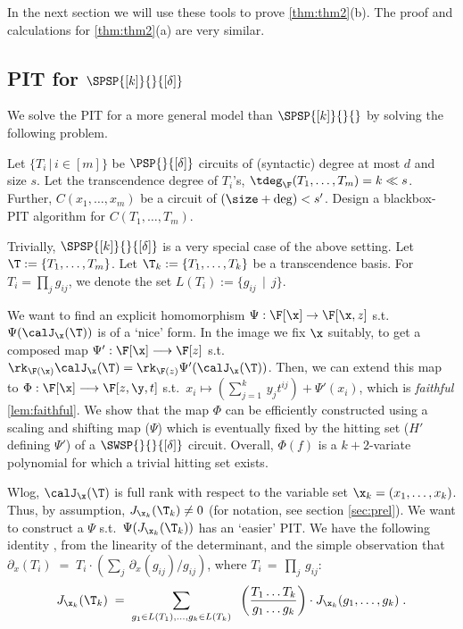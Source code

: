 In the next section we will use these tools to prove \autoref{thm:thm2}(b). The proof and calculations for \autoref{thm:thm2}(a) are very similar.

\subsection{PIT for \texorpdfstring{$\SPSP{[k]}{}{[\delta]}$}{SkPSPdelta}} \label{sec:SkPSPdelta}

We solve the PIT for a more general model than $\SPSP{[k]}{}{}$ by solving the following problem.

\begin{problem}\label{prob:prob1-thm2}
 Let $\{T_i \,|\, i \in [m]\}$ be $\PSP{}{[\delta]}$ circuits of (syntactic) degree at most $d$ and size $s$. Let the transcendence degree of $T_i$'s, $\tdeg_{\F}(T_1,\hdots,T_m)= k\ll s$. Further, $C(x_1,\hdots,x_m)$ be a circuit of $(\size + \deg) < s'$. Design a blackbox-PIT algorithm for $C(T_1,\hdots,T_m)$.
\end{problem}

Trivially, $\SPSP{[k]}{}{[\delta]}$ is a very special case of the above setting. Let $\T:=\{T_1,\hdots,T_m\}$. Let $\T_{k}:=\{T_1,\hdots,T_k\}$ be a transcendence basis. For $T_i=\prod_{j} g_{ij}$, we denote the set $L(T_i):=\{g_{ij}\,\mid\,j\}$. 

We want to find an explicit homomorphism $\Psi : \F[\x] \to \F[\x,z]$ s.t.~$\Psi(\calJ_{\x}(\T))$ is of a `nice' form. In the image we fix $\x$ suitably, to get a composed map $\Psi' : \F[\x] \longrightarrow \F[z]$ s.t.~$\rk_{\F(\x)}\calJ_{\x}(\T) = \rk_{\F(z)}\Psi'(\calJ_{\x}(\T))$. Then, we can extend this map to $\Phi : \F[\x] \longrightarrow \F[z,\y,t]$ s.t.~$x_i \mapsto (\sum_{j=1}^k\,y_jt^{ij}) + \Psi'(x_i)$, which is \emph{faithful} \autoref{lem:faithful}. We show that the map $\Phi$ can be efficiently constructed using a scaling and shifting map ($\Psi$) which is eventually fixed by the hitting set ($H'$ defining $\Psi'$) of a $\SWSP{}{}{[\delta]}$ circuit. Overall, $\Phi(f)$ is a $k+2$-variate polynomial for which a trivial hitting set exists.

Wlog, $\calJ_{\x}(\T)$ is full rank with respect to the variable set $\x_{k}=(x_1,\hdots,x_k)$. Thus, by assumption, $J_{{\x}_k}(\T_k) \ne 0$ (for notation, see section \ref{sec:prel}). We want to construct a $\Psi$ s.t.~$\Psi(J_{{\x}_k}(\T_k))$ has an `easier' PIT. We have the following identity \cite[Eqn.~3.1]{agrawal2016jacobian}, from the linearity of the determinant, and the simple observation that $\partial_{x}(T_i) \;=\; T_i \cdot \left(\sum_{j}\,\partial_{x}(g_{ij})/g_{ij}\right)$, where $T_i\,=\,\prod_{j}\,g_{ij} $:
\begin{align}
    J_{{\x}_k}(\T_k)\;=\;\sum_{g_1 \in L(T_1) , \hdots , g_k \in L(T_k)}\;\; \left( \frac{T_1\hdots T_k}{g_1 \hdots g_k}\right) \cdot J_{{\x}_k}(g_1,\hdots,g_k)\;. \label{jacobian-main-eq}
\end{align}

